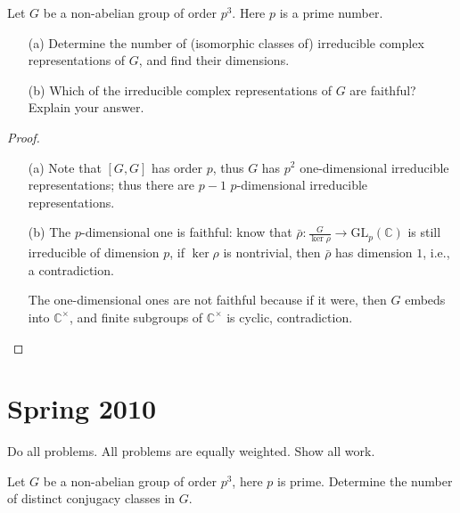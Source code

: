 \documentclass[openany]{book}
\newcommand{\C}{\mathbb{C}}
\begin{document}
\begin{prob}
    Let \(G\) be a non-abelian group of order \(p^3\). Here \(p\) is a prime number.
    \begin{itemize}
        \item[(a)] Determine the number of (isomorphic classes of) irreducible complex representations of \(G\), and find their dimensions.
        \item[(b)] Which of the irreducible complex representations of \(G\) are faithful? Explain your answer.
    \end{itemize}
\end{prob}
\begin{proof}
    \begin{itemize}
        \item[(a)] Note that $[G,G]$ has order $p$, thus $G$ has $p^2$ one-dimensional irreducible representations; thus there are $p-1$ $p$-dimensional irreducible representations.
        \item[(b)] The $p$-dimensional one is faithful: know that $\bar{\rho}:\frac{G}{\ker\rho}\to\text{GL}_p(\C)$ is still irreducible of dimension $p$, if $\ker\rho$ is nontrivial, then $\bar{\rho}$ has dimension $1$, i.e., a contradiction. 
        
        The one-dimensional ones are not faithful because if it were, then $G$ embeds into $\C^\times$, and finite subgroups of $\C^\times$ is cyclic, contradiction.
    \end{itemize}
\end{proof}










\chapter{Spring 2010}

Do all problems. All problems are equally weighted. Show all work.


\begin{prob}
    Let \(G\) be a non-abelian group of order \(p^3\), here \(p\) is prime. Determine the number of distinct conjugacy classes in \(G\).
\end{prob}
\end{document}
